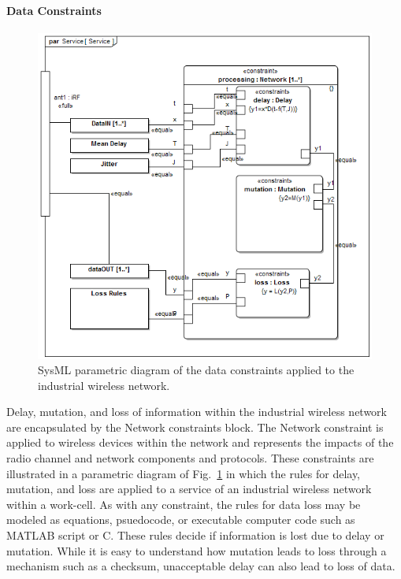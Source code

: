 \documentclass[journal, twoside]{IEEEtran}
\begin{document}
	\paragraph{Data Constraints}\label{sec:constraints:data}
	
	\begin{figure}[tbp]
		\includegraphics[width=\columnwidth]{diagrams/par__Service__Service}%
		\caption{SysML parametric diagram of the data constraints applied to the industrial wireless network.}%
		\label{fig:par:iwn:data}
	\end{figure}    
	
	Delay, mutation, and loss of information within the industrial wireless network are encapsulated by the Network constraints block.  The Network constraint is applied to wireless devices within the network and represents the impacts of the radio channel and network components and protocols.  These constraints are illustrated in a parametric diagram of Fig.~\ref{fig:par:iwn:data} in which the rules for delay, mutation, and loss are applied to a service of an industrial wireless network within a work-cell. As with any constraint, the rules for data loss may be modeled as equations, psuedocode, or executable computer code such as MATLAB script or C.  These rules decide if information is lost due to delay or mutation.  While it is easy to understand how mutation leads to loss through a mechanism such as a checksum, unacceptable delay can also lead to loss of data.  
	
\end{document}
